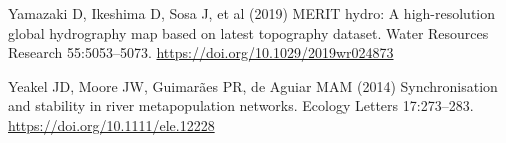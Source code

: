 \documentclass[
  12pt,
]{article}
\newlength{\cslhangindent}
\newlength{\cslentryspacingunit} %
\newenvironment{CSLReferences}[2] %
 {%
  \setlength{\parindent}{0pt}
  \ifodd #1
  \let\oldpar\par
  \def\par{\hangindent=\cslhangindent\oldpar}
  \fi
  \setlength{\parskip}{#2\cslentryspacingunit}
 }%
 {}
\begin{document}
\begin{CSLReferences}{1}{0}
\leavevmode{}%
Yamazaki D, Ikeshima D, Sosa J, et al (2019) {MERIT} hydro: A high-resolution global hydrography map based on latest topography dataset. Water Resources Research 55:5053--5073. \url{https://doi.org/10.1029/2019wr024873}

\leavevmode{}%
Yeakel JD, Moore JW, Guimarães PR, de Aguiar MAM (2014) Synchronisation and stability in river metapopulation networks. Ecology Letters 17:273--283. \url{https://doi.org/10.1111/ele.12228}

\end{CSLReferences}
\end{document}

